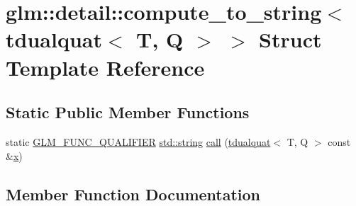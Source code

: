 \hypertarget{structglm_1_1detail_1_1compute__to__string_3_01tdualquat_3_01_t_00_01_q_01_4_01_4}{}\section{glm\+:\+:detail\+:\+:compute\+\_\+to\+\_\+string$<$ tdualquat$<$ T, Q $>$ $>$ Struct Template Reference}
\label{structglm_1_1detail_1_1compute__to__string_3_01tdualquat_3_01_t_00_01_q_01_4_01_4}
\subsection*{Static Public Member Functions}
\begin{DoxyCompactItemize}
\item 
static \hyperlink{setup_8hpp_a33fdea6f91c5f834105f7415e2a64407}{G\+L\+M\+\_\+\+F\+U\+N\+C\+\_\+\+Q\+U\+A\+L\+I\+F\+I\+ER} \hyperlink{_s_d_l__opengl__glext_8h_ae84541b4f3d8e1ea24ec0f466a8c568b}{std\+::string} \hyperlink{structglm_1_1detail_1_1compute__to__string_3_01tdualquat_3_01_t_00_01_q_01_4_01_4_a312a529ab87f8e85ad185676dd31267d}{call} (\hyperlink{structglm_1_1tdualquat}{tdualquat}$<$ T, Q $>$ const \&\hyperlink{_s_d_l__opengl_8h_ad0e63d0edcdbd3d79554076bf309fd47}{x})
\end{DoxyCompactItemize}


\subsection{Member Function Documentation}
\mbox{\label{structglm_1_1detail_1_1compute__to__string_3_01tdualquat_3_01_t_00_01_q_01_4_01_4_a312a529ab87f8e85ad185676dd31267d}} 

